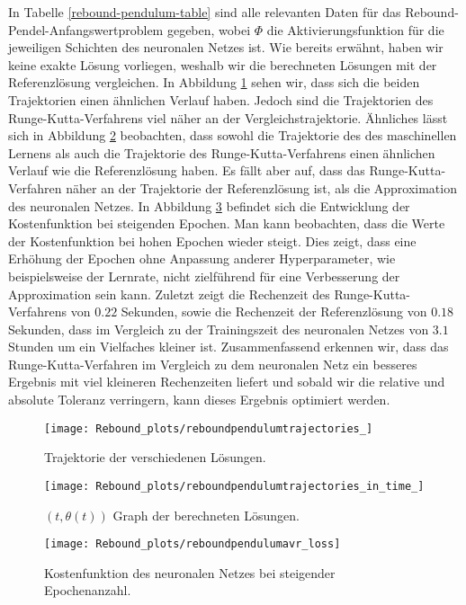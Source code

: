 In Tabelle \ref{rebound-pendulum-table} sind alle relevanten Daten für das Rebound-Pendel-Anfangswertproblem gegeben,
wobei $\Phi$ die Aktivierungsfunktion für die jeweiligen Schichten des neuronalen Netzes ist. Wie bereits erwähnt, haben
wir keine exakte Lösung vorliegen, weshalb wir die berechneten Lösungen mit der Referenzlösung vergleichen.
In Abbildung \ref{fig:rebound-trajectories} sehen wir, dass sich die beiden Trajektorien einen ähnlichen
Verlauf haben. Jedoch sind die Trajektorien des Runge-Kutta-Verfahrens viel näher an der Vergleichstrajektorie.
Ähnliches lässt sich in Abbildung \ref{fig:rebound-trajectories-in-time} beobachten, dass sowohl die Trajektorie des
des maschinellen Lernens als auch die Trajektorie des Runge-Kutta-Verfahrens einen ähnlichen Verlauf wie die
Referenzlösung haben. Es fällt aber auf, dass das Runge-Kutta-Verfahren näher an der Trajektorie der Referenzlösung ist,
als die Approximation des neuronalen Netzes. In Abbildung \ref{fig:rebound-loss} befindet sich die Entwicklung der
Kostenfunktion bei steigenden Epochen. Man kann beobachten, dass die Werte der Kostenfunktion bei hohen Epochen wieder
steigt. Dies zeigt, dass eine Erhöhung der Epochen ohne Anpassung anderer Hyperparameter, wie beispielsweise der
Lernrate, nicht zielführend für eine Verbesserung der Approximation sein kann. Zuletzt zeigt die Rechenzeit des
Runge-Kutta-Verfahrens von $0.22$ Sekunden, sowie die Rechenzeit der Referenzlösung von $0.18$ Sekunden, dass im
Vergleich zu der Trainingszeit des neuronalen Netzes von $3.1$ Stunden um ein Vielfaches kleiner ist. Zusammenfassend
erkennen wir, dass das Runge-Kutta-Verfahren im Vergleich zu dem neuronalen Netz ein besseres Ergebnis mit viel
kleineren Rechenzeiten liefert und sobald wir die relative und absolute Toleranz verringern, kann dieses Ergebnis
optimiert werden.
\begin{figure}
       \centering
       \texttt{[image: Rebound\_plots/reboundpendulumtrajectories\_]}
       \caption{Trajektorie der verschiedenen Lösungen.}
       \label{fig:rebound-trajectories}
\end{figure}
\begin{figure}
       \centering
       \texttt{[image: Rebound\_plots/reboundpendulumtrajectories\_in\_time\_]}
       \caption{$(t, \theta(t))$ Graph der berechneten Lösungen.}
       \label{fig:rebound-trajectories-in-time}
\end{figure}
\begin{figure}
       \centering
       \texttt{[image: Rebound\_plots/reboundpendulumavr\_loss]}
       \caption{Kostenfunktion des neuronalen Netzes bei steigender Epochenanzahl.}
       \label{fig:rebound-loss}
\end{figure}
\clearpage

